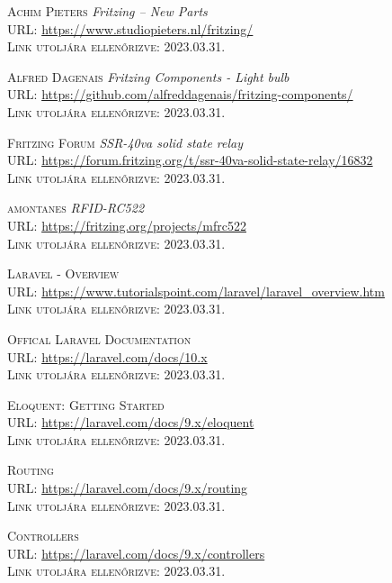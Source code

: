 \documentclass[
]{thesis-ekf}
\theoremstyle{definition}
\theoremstyle{remark}
\begin{document}
\begin{thebibliography}{20}
		\textsc{Achim Pieters} \emph{Fritzing – New Parts}\\
		\textsc{URL:} \url{https://www.studiopieters.nl/fritzing/}\\
		\textsc{Link utoljára ellenőrizve:} 2023.03.31.
		
		\textsc{Alfred Dagenais} \emph{Fritzing Components - Light bulb}\\
		\textsc{URL:} \url{https://github.com/alfreddagenais/fritzing-components/}\\
		\textsc{Link utoljára ellenőrizve:} 2023.03.31.
		
		\textsc{Fritzing Forum} \emph{SSR-40va solid state relay}\\
		\textsc{URL:} \url{https://forum.fritzing.org/t/ssr-40va-solid-state-relay/16832}\\
		\textsc{Link utoljára ellenőrizve:} 2023.03.31.
		
		\textsc{amontanes} \emph{RFID-RC522}\\
		\textsc{URL:} \url{https://fritzing.org/projects/mfrc522}\\
		\textsc{Link utoljára ellenőrizve:} 2023.03.31.
		
		\textsc{Laravel - Overview}\\
		\textsc{URL:} \url{https://www.tutorialspoint.com/laravel/laravel_overview.htm}\\
		\textsc{Link utoljára ellenőrizve:} 2023.03.31.
		
		\textsc{Offical Laravel Documentation}\\
		\textsc{URL:} \url{https://laravel.com/docs/10.x}\\
		\textsc{Link utoljára ellenőrizve:} 2023.03.31.
		
		\textsc{Eloquent: Getting Started}\\
		\textsc{URL:} \url{https://laravel.com/docs/9.x/eloquent}\\
		\textsc{Link utoljára ellenőrizve:} 2023.03.31.
		
		\textsc{Routing}\\
		\textsc{URL:} \url{https://laravel.com/docs/9.x/routing}\\
		\textsc{Link utoljára ellenőrizve:} 2023.03.31.
		
		\textsc{Controllers}\\
		\textsc{URL:} \url{https://laravel.com/docs/9.x/controllers}\\
		\textsc{Link utoljára ellenőrizve:} 2023.03.31.
		

\end{thebibliography}
\end{document}
